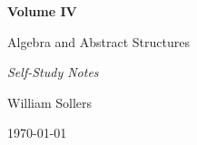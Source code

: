\begin{titlepage}
\centering

\vspace*{5cm}

{\Huge\bfseries Volume IV\par}

\vspace{0.5cm}

{\LARGE Algebra and Abstract Structures\par}

\vspace{0.5cm}

{\large\itshape Self-Study Notes\par}

\vfill

{\large William Sollers\par}

\vspace{0.5cm}

{\large \today\par}

\end{titlepage}
